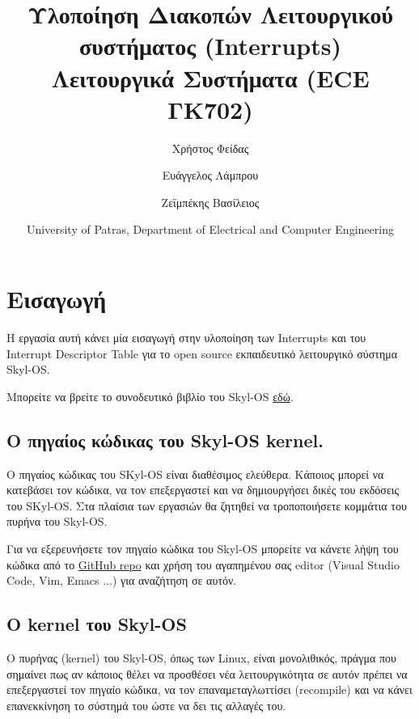 \documentclass[18pt]{extarticle}
\title{Υλοποίηση Διακοπών Λειτουργικού συστήματος (Interrupts) \\Λειτουργικά Συστήματα (ECE ΓΚ702)} %
\author{
    \footnotesize Χρήστος Φείδας\\ 
    \footnotesize \src{fidas@upatras.gr} \and 
    \footnotesize Ευάγγελος Λάμπρου\\ 
    \footnotesize \src{e.lamprou@upnet.gr} \and
    \footnotesize Ζεϊμπέκης Βασίλειος\\
    \footnotesize \src{bzeimp@gmail.com}
} %
\date{University of Patras, Department of Electrical and Computer Engineering} %
\begin{document}
\pagestyle{fancy}
\fancyhf{} %
\renewcommand{\headrulewidth}{0pt}
\fancyhead{} %
\fancyfoot{} %
\fancyfoot[R]{\thepage}

\maketitle


\section{Εισαγωγή}

Η εργασία αυτή κάνει μία εισαγωγή στην υλοποίηση των Interrupts και του Interrupt Descriptor Table
για το open source εκπαιδευτικό λειτουργικό σύστημα Skyl-OS.

Μπορείτε να βρείτε το συνοδευτικό βιβλίο του Skyl-OS \href{https://github.com/Billyzeim/Skyl-OS/blob/main/docs/book/main.pdf}{εδώ}.

\subsection{Ο πηγαίος κώδικας του Skyl-OS kernel.}

Ο πηγαίος κώδικας του SKyl-OS είναι διαθέσιμος ελεύθερα. 
Κάποιος μπορεί να κατεβάσει τον κώδικα, να τον επεξεργαστεί και να δημιουργήσει δικές του εκδόσεις του SKyl-OS.
Στα πλαίσια των εργασιών θα ζητηθεί να τροποποιήσετε κομμάτια του πυρήνα του Skyl-OS.

Για να εξερευνήσετε τον πηγαίο κώδικα του Skyl-OS μπορείτε να κάνετε λήψη του κώδικα 
από το \href{https://github.com/Billyzeim/Skyl-OS/blob/main/}{GitHub repo} και χρήση του αγαπημένου σας editor 
(Visual Studio Code, Vim, Emacs ...) για αναζήτηση σε αυτόν.

\subsection{Ο kernel του Skyl-OS}

Ο πυρήνας (kernel) του Skyl-OS, όπως των Linux, είναι μονολιθικός, πράγμα που σημαίνει πως αν κάποιος θέλει να 
προσθέσει νέα λειτουργικότητα σε αυτόν πρέπει να επεξεργαστεί τον πηγαίο κώδικα, 
να τον επαναμεταγλωττίσει (recompile) και να κάνει επανεκκίνηση το σύστημά του ώστε να δει τις αλλαγές του.
\end{document}
